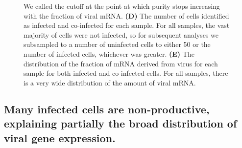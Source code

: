 \documentclass[9pt,lineno]{elife}
\begin{document}
\begin{figure}
{We called the cutoff at the point at which purity stops increasing with the fraction of viral mRNA.
{\bf (D)}
The number of cells identified as infected and co-infected for each sample.
For all samples, the vast majority of cells were not infected, so for subsequent analyses we subsampled to a number of uninfected cells to either 50 or the number of infected cells, whichever was greater.
{\bf (E)} 
The distribution of the fraction of mRNA derived from virus for each sample for both infected and co-infected cells.
For all samples, there is a very wide distribution of the amount of viral mRNA.
}
\end{figure}

\subsection{Many infected cells are non-productive, explaining partially the broad distribution of viral gene expression.}
\end{document}
